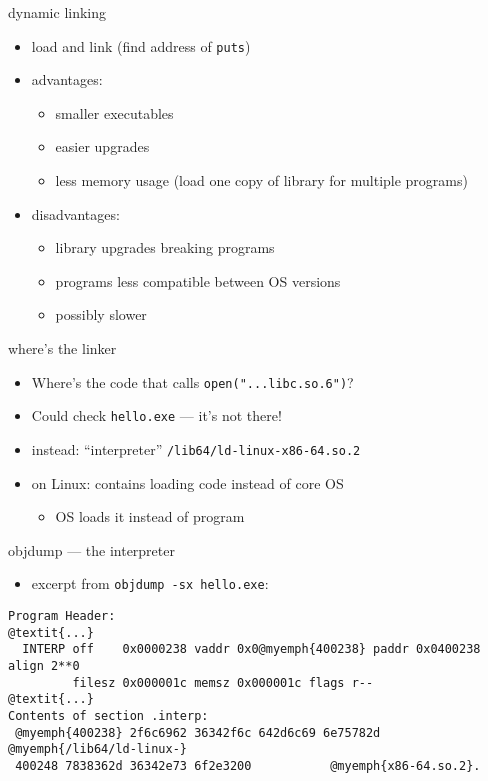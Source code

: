 \begin{frame}{dynamic linking}
\begin{itemize}
    \item load and link (find address of {\tt puts}) 
    \item advantages:
        \begin{itemize}
        \item smaller executables
        \item easier upgrades
        \item less memory usage (load one copy of library for multiple programs)
        \end{itemize}
    \item disadvantages:
        \begin{itemize}
        \item library upgrades breaking programs
        \item programs less compatible between OS versions
        \item possibly slower
        \end{itemize}
\end{itemize}
\end{frame}

\begin{frame}{where's the linker}
\begin{itemize}
    \item Where's the code that calls {\tt open("...libc.so.6")}?
    \item Could check {\tt hello.exe} --- it's not there!
    \vspace{.5cm}
    \item<2> instead: ``interpreter'' {\tt /lib64/ld-linux-x86-64.so.2}
    \item<2> on Linux: contains loading code instead of core OS
        \begin{itemize}
        \item OS loads it instead of program
        \end{itemize}
\end{itemize}
\end{frame}

\begin{frame}[fragile,label=interpObjdump]{objdump --- the interpreter}
\begin{itemize}
\item excerpt from {\tt objdump -sx hello.exe}:
\end{itemize}
\begin{Verbatim}[commandchars=@\{\},fontsize=\fontsize{8}{9}\selectfont]
Program Header:
@textit{...}
  INTERP off    0x0000238 vaddr 0x0@myemph{400238} paddr 0x0400238 align 2**0
         filesz 0x000001c memsz 0x000001c flags r--
@textit{...}
Contents of section .interp:
 @myemph{400238} 2f6c6962 36342f6c 642d6c69 6e75782d  @myemph{/lib64/ld-linux-}
 400248 7838362d 36342e73 6f2e3200           @myemph{x86-64.so.2}.    
\end{Verbatim}
\end{frame}

